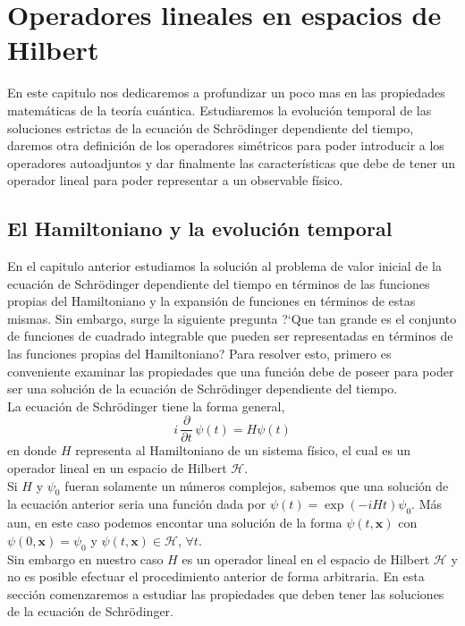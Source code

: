 \documentclass[12pt]{book}
\numberwithin{equation}{chapter}
\def\H{\mathcal{H}}
\def\x{\mathbf{x}}
\begin{document}
\chapter{Operadores lineales en espacios de Hilbert}
En este capitulo nos dedicaremos a profundizar un poco mas en las propiedades matem\'aticas de la teor\'ia cu\'antica. Estudiaremos la evoluci\'on temporal de las soluciones estrictas de la ecuaci\'on de Schr\"odinger dependiente del tiempo, daremos otra definici\'on de los operadores sim\'etricos para poder introducir a los operadores autoadjuntos y dar finalmente las caracter\'isticas que debe de tener un operador lineal para poder representar a un observable f\'isico.

\section{El Hamiltoniano y la evoluci\'on temporal}

En el capitulo anterior estudiamos la soluci\'on al problema de valor inicial de la ecuaci\'on de Schr\"odinger dependiente del tiempo en t\'erminos de las funciones propias del Hamiltoniano y la expansi\'on de funciones en t\'erminos de estas mismas. Sin embargo, surge la siguiente pregunta ?`Que tan grande es el conjunto de funciones de cuadrado integrable que pueden ser representadas en t\'erminos de las funciones propias del Hamiltoniano? Para resolver esto, primero es conveniente examinar las propiedades que una funci\'on debe de poseer para poder ser una soluci\'on de la ecuaci\'on de Schr\"odinger dependiente del tiempo.\\

La ecuaci\'on de Schr\"odinger tiene la forma general,
\begin{equation}\label{schh}
i \, \frac{\partial}{\partial t}\, \psi (t) = H \psi (t)
\end{equation}
en donde $H$ representa al Hamiltoniano de un sistema f\'isico, el cual es un operador lineal en un espacio de Hilbert $\H$. \\
Si $H$ y $\psi_{0}$ fueran solamente un n\'umeros complejos, sabemos que una soluci\'on de la ecuaci\'on anterior seria una funci\'on dada por $\psi(t) = \exp ( -iHt ) \psi_{0} $. M\'as aun, en este caso podemos encontar una soluci\'on de la forma $\psi(t,\x)$ con $\psi(0,\x) = \psi_{0}$ y $\psi(t,\x) \in \H$, $\forall t$.\\

Sin embargo en nuestro caso $H$ es un operador lineal en el espacio de Hilbert $\H$ y no es posible efectuar el procedimiento anterior de forma arbitraria. En esta secci\'on comenzaremos a estudiar las propiedades que deben tener las soluciones de la ecuaci\'on de Schr\"odinger.\\
\end{document}
